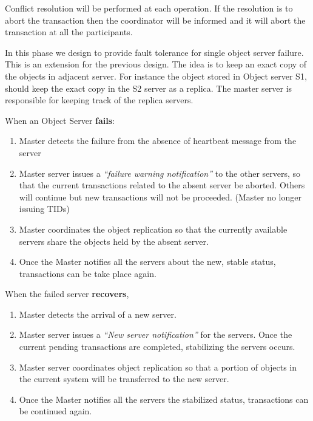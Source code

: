 \documentclass[times, 10pt,twocolumn]{article}
\begin{document}
Conflict resolution will be performed at each operation. If the resolution is to abort the transaction then the coordinator will be informed and it will abort the transaction at all the participants.

\label{subsec:faultol}
In this phase we design to provide fault tolerance for single object server failure. This is an extension for the previous design. The idea is to keep an exact copy of the objects in adjacent server.
For instance the object stored in Object server S1, should keep the exact copy in the S2 server as a replica. The master server is responsible for keeping track of the replica servers.

When an Object Server {\bf fails}:
\begin{enumerate}
\item Master detects the failure from the absence of heartbeat message from the server
\item Master server issues a {\it “failure warning notification”} to the other servers, so that the current transactions related to the absent server be aborted.
Others will continue but new transactions will not be proceeded. (Master no longer issuing TIDs)
\item Master coordinates the object replication so that the currently available servers share the objects held by the absent server.
\item Once the Master notifies all the servers about the new, stable status, transactions can be take place again.
\end{enumerate}

When the failed server {\bf recovers},
\begin{enumerate}
\item Master detects the arrival of a new server.
\item Master server issues a {\it “New server notification”} for the servers. Once the current pending transactions are completed, stabilizing the servers occurs.
\item Master server coordinates object replication so that a portion of objects in the current system will be transferred to the new server.
\item Once the Master notifies all the servers the stabilized status, transactions can be continued again.
\end{enumerate}






\end{document}
